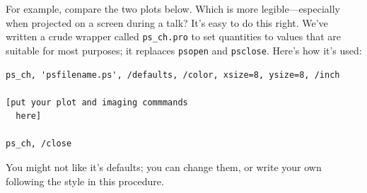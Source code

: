 \documentclass[psfig,preprint]{aastex}
\begin{document}
For example, compare the two plots below. Which is more
legible---especially when projected on a screen during a talk? It's easy
to do this right. We've written a crude wrapper called {\tt ps\_ch.pro}
to set quantities to values that are suitable for most purposes; it
replaaces {\tt psopen} and {\tt psclose}. Here's how it's used:
\begin{verbatim}                                                                            
ps_ch, 'psfilename.ps', /defaults, /color, xsize=8, ysize=8, /inch                          
                                                                                            
[put your plot and imaging commmands
  here]                                                  
                                                                                            
ps_ch, /close                                                                               
\end{verbatim}

\noindent You might not like it's defaults; you can change them, or
write your own following the style in this procedure.
\end{document}
